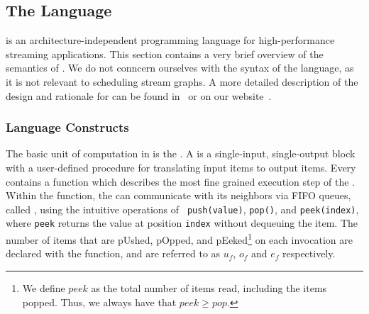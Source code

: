 \subsection{The {\StreamIt} Language}
\label{sec:streamit}

{\StreamIt} is an architecture-independent programming language for
high-performance streaming applications.  This section contains a very
brief overview of the semantics of {\StreamIt}.  We do not conncern
ourselves with the syntax of the language, as it is not relevant to
scheduling stream graphs. A more detailed description of the design
and rationale for {\StreamIt} can be found in~\cite{thies02streamit}
or on our website~\cite{streamitweb}.

\subsubsection{Language Constructs}

The basic unit of computation in {\StreamIt} is the {\filter}. A
{\filter} is a single-input, single-output block with a user-defined
procedure for translating input items to output items.  Every
{\filter} contains a {\work} function which describes the most fine
grained execution step of the {\filter}. Within the {\work} function,
the {\filter} can communicate with its neighbors via FIFO queues,
called {\Channels}, using the intuitive operations of {\tt
push(value)}, {\tt pop()}, and {\tt peek(index)}, where {\tt peek}
returns the value at position {\tt index} without dequeuing the item.
The number of items that are pUshed, pOpped, and
pEeked\footnote{{\small We define $peek$ as the total number of items
read, including the items popped.  Thus, we always have that $peek \ge
pop$.}} on each invocation are declared with the {\work} function, and
are referred to as $u_f$, $o_f$ and $e_f$ respectively.



